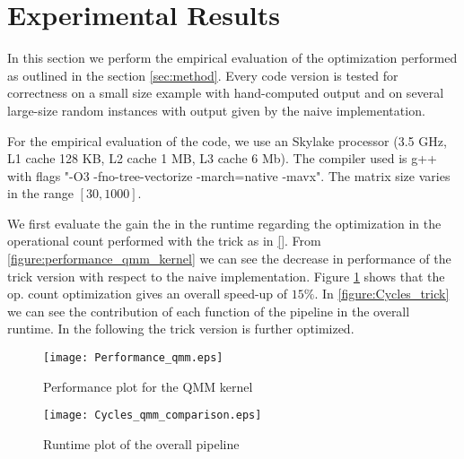 \section{Experimental Results}\label{sec:exp}
\graphicspath{{../../plots/}}

In this section we perform the empirical evaluation of the optimization performed as outlined in the section \ref{sec:method}. Every code version is tested for correctness on a small size example with hand-computed output and on several large-size random instances with output given by the naive implementation.

\begin{comment}
Specify the platform (processor, frequency, cache sizes)
as well as the compiler, version, and flags used. I strongly recommend that you play with optimization flags and consider also icc for additional potential speedup.

Then explain what input you used and what range of sizes. The idea is to give enough information so the experiments are reproducible by somebody else on his or her code.
\end{comment}
For the empirical evaluation of the code, we use an Skylake processor (3.5 GHz, L1 cache 128 KB, L2 cache 1 MB, L3 cache 6 Mb). The compiler used is g++ with flags "-O3 -fno-tree-vectorize -march=native -mavx". The matrix size varies in the range $[30,1000]$.

We first evaluate the gain the in the runtime regarding the optimization in the operational count performed with the trick as in \ref{}. From \cref{figure:performance_qmm_kernel} we can see the decrease in performance of the trick version with respect to the naive implementation. Figure \cref{figure:cycles_qmm_comparison} shows that the op. count optimization gives an overall speed-up of $15 \%$. In \cref{figure:Cycles_trick} we can see the contribution of each function of the pipeline in the overall runtime. In the following the trick version is further optimized.

\begin{figure}[h]
\texttt{[image: Performance\_qmm.eps]}
\caption{Performance plot for the QMM kernel}
\label{figure:performance_qmm_kernel}

\texttt{[image: Cycles\_qmm\_comparison.eps]}
\caption{Runtime plot of the overall pipeline}
\label{figure:cycles_qmm_comparison}
\end{figure}

